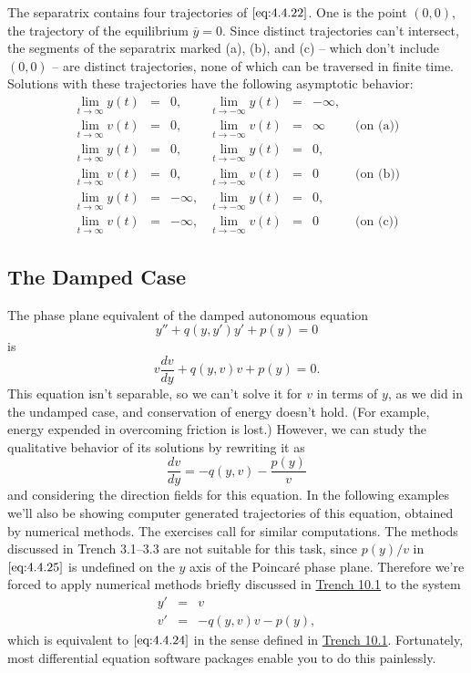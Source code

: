 \documentclass{ximera}
\begin{document}
\begin{example}
The separatrix contains four trajectories of $\eqref{eq:4.4.22}$. One is the
point $(0,0)$, the trajectory of the equilibrium $\overline{y}=0$.
Since distinct trajectories can't intersect, the segments of the
separatrix marked (a), (b), and (c) -- which don't include $(0,0)$ --
are distinct trajectories, none of which can be traversed in finite
time. Solutions with these trajectories have the following asymptotic
behavior:
$$
\begin{array}{llrllrl}
\lim_{t\rightarrow\infty}y(t)&=&0, &\lim_{t\rightarrow-\infty}y(t)&=&-\infty,\\
\lim_{t\rightarrow\infty}v(t)&=&0,
&\lim_{t\rightarrow-\infty}v(t)&=&\infty&
\mbox{ (on (a))}  \\
\lim_{t\rightarrow\infty}y(t)&=&0, &\lim_{t\rightarrow-\infty}y(t)&=&0,\\
\lim_{t\rightarrow\infty}v(t)&=&0,
&\lim_{t\rightarrow-\infty}v(t)&=&0&
\mbox{ (on (b))}  \\
\lim_{t\rightarrow\infty}y(t)&=&-\infty, &\lim_{t\rightarrow-\infty}y(t)&=&0,\\
\lim_{t\rightarrow\infty}v(t)&=&-\infty,
&\lim_{t\rightarrow-\infty}v(t)&=&0&
\mbox{ (on (c))}
\end{array}
$$
\end{example}
 
 
\subsection*{The Damped Case}
 
The phase plane equivalent of the damped autonomous equation
\begin{equation}\label{eq:4.4.24}
y''+q(y,y')y'+p(y)=0
\end{equation}
is
$$
v\frac{dv}{dy}+q(y,v)v+p(y)=0.
$$
This equation isn't  separable, so we can't solve it for $v$ in terms
of
$y$,
as we did in the undamped case, and conservation of energy doesn't
hold. (For example, energy expended in overcoming friction is lost.)
However, we can study the qualitative behavior of its solutions by
rewriting it as
\begin{equation}\label{eq:4.4.25}
\frac{dv}{dy}=-q(y,v)-\frac{p(y)}{v}
\end{equation}
and considering the direction fields for this equation. In the
following examples we'll also be showing computer generated
trajectories of this equation, obtained by numerical methods. The
exercises call for similar computations. 
The methods discussed in
Trench 3.1--3.3 are not suitable for this
task, since  $p(y)/v$ in $\eqref{eq:4.4.25}$ is undefined on the $y$ axis
of the Poincar\'e phase plane. Therefore we're forced to apply
numerical methods briefly discussed in
\href{https://ximera.osu.edu/ode/main/introToSystems/introToSystems}{Trench 10.1} to the
system
\begin{eqnarray*}
y'&=&v\\
v'&=&-q(y,v)v-p(y),
\end{eqnarray*}
which is equivalent to $\eqref{eq:4.4.24}$ 
in the sense defined in \href{https://ximera.osu.edu/ode/main/introToSystems/introToSystems}{Trench 10.1}. 
Fortunately, most differential equation software
packages  enable you to do this painlessly.
 
\end{document}
